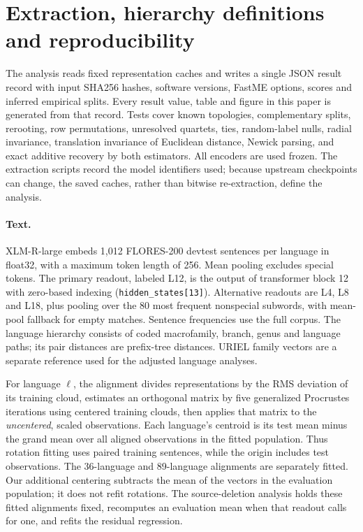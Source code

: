 \documentclass[mlmain]{jmlr}
\begin{document}

\clearpage
\appendix

\section{Extraction, hierarchy definitions and reproducibility}
\label{app:extraction}

The analysis reads fixed representation caches and writes a single JSON result record with input
SHA256 hashes, software versions, FastME options, scores and inferred empirical splits. Every
result value, table and figure in this paper is generated from that record. Tests cover
known topologies, complementary splits, rerooting, row permutations, unresolved quartets, ties,
random-label nulls, radial invariance, translation invariance of Euclidean distance, Newick parsing,
and exact additive recovery by both estimators. All encoders are used frozen. The extraction
scripts record the model identifiers used; because upstream checkpoints can change, the saved
caches, rather than bitwise re-extraction, define the analysis.

\paragraph{Text.}
XLM-R-large \citep{conneau-etal-2020-unsupervised} embeds 1,012 FLORES-200 devtest sentences per
language \citep{nllb2022} in float32, with a maximum token length of 256. Mean pooling excludes
special tokens. The primary readout, labeled L12, is the output of transformer block 12 with
zero-based indexing (\texttt{hidden\_states[13]}). Alternative readouts are L4, L8 and L18,
plus pooling over the 80 most frequent nonspecial subwords, with mean-pool fallback for empty
matches. Sentence frequencies use the full corpus. The language hierarchy consists of coded
macrofamily, branch, genus and language paths; its pair distances are prefix-tree distances.
URIEL family vectors are a separate reference used for the adjusted language analyses.

For language $\ell$, the alignment divides representations by the RMS deviation of its training
cloud, estimates an orthogonal matrix by five generalized Procrustes iterations using centered
training clouds, then applies that matrix to the \emph{uncentered}, scaled observations. Each
language's centroid is its test mean minus the grand mean over all aligned observations in the
fitted population. Thus rotation fitting uses paired training sentences, while the origin includes test
observations. The 36-language and 89-language alignments are separately fitted. Our additional
centering subtracts the mean of the vectors in the evaluation population; it does not refit
rotations. The source-deletion analysis holds these fitted alignments fixed, recomputes an evaluation
mean when that readout calls for one, and refits the residual regression.
\end{document}

